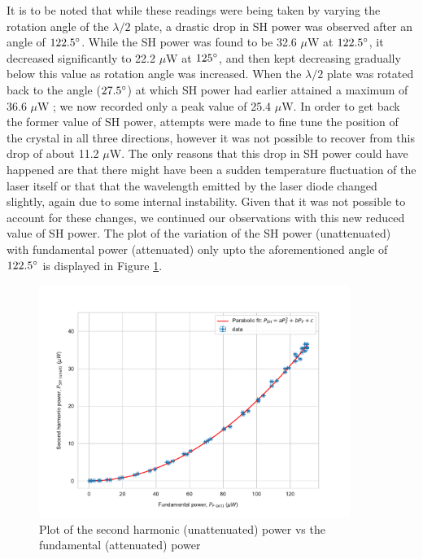 \label{anomaly}
It is to be noted that while these readings were being taken by varying the rotation angle of the $\lambda /2$ plate, a drastic drop in SH power was observed after an angle of $122.5 \degree$. While the SH power was found to be 32.6 $\mu$W at $122.5 \degree$, it decreased significantly to 22.2 $\mu$W at $125 \degree$, and then kept decreasing gradually below this value as rotation angle was increased. When the $\lambda /2$ plate was rotated back to the angle ($27.5 \degree$) at which SH power had earlier attained a maximum of 36.6 $\mu$W ; we now recorded only a peak value of 25.4 $\mu$W. In order to get back the former value of SH power, attempts were made to fine tune the position of the crystal in all three directions, however it was not possible to recover from this drop of about 11.2 $\mu$W. The only reasons that this drop in SH power could have happened are that there might have been a sudden temperature fluctuation of the laser itself or that that the wavelength emitted by the laser diode changed slightly, again due to some internal instability. Given that it was not possible to account for these changes, we continued our observations with this new reduced value of SH power. The plot of the variation of the SH power (unattenuated) with fundamental power (attenuated) only upto the aforementioned angle of $122.5 \degree$ is displayed in Figure \ref{figexpt7}.

\begin{figure}[H]
\includegraphics[width=0.9\textwidth]{./imagesandplots/shpowvsfundpow.pdf}
\centering
\caption{Plot of the second harmonic (unattenuated) power vs the fundamental (attenuated) power}
\label{figexpt7}
\end{figure}

